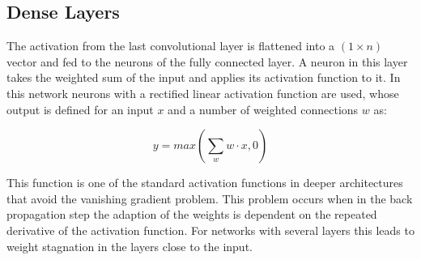 \documentclass[main.tex]{subfiles}
\begin{document}
\subsection{Dense Layers}
The activation from the last convolutional layer is flattened into a $(1 \times n)$ vector and fed to the neurons of the fully connected layer. A neuron in this layer takes the weighted sum of the input and applies its activation function to it. In this network neurons with a rectified linear activation function are used, whose output is defined for an input $x$ and a number of weighted connections $w$ as:

\begin{equation}
\label{eq:dense}
y=max(\sum_w w \cdot x,0)
\end{equation}

This function is one of the standard activation functions in deeper architectures that avoid the vanishing gradient problem. This problem occurs when in the back propagation step the adaption of the weights is dependent on the repeated derivative of the activation function. For networks with several layers this leads to weight stagnation in the layers close to the input.
\end{document}
